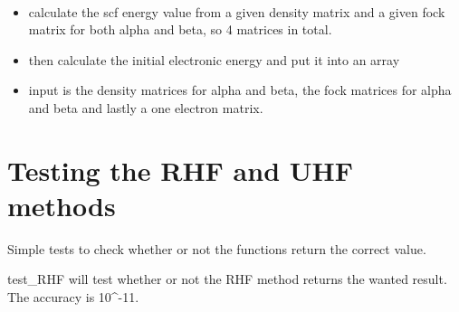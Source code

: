 \documentclass[letterpaper,10pt,english]{sphinxmanual}
\begin{document}
\begin{fulllineitems}
\label{\detokenize{SCF_functions:ghf.SCF_functions.uhf_scf_energy}}~\begin{itemize}
\item {} 
calculate the scf energy value from a given density matrix and a given fock matrix for both alpha and beta,
so 4 matrices in total.

\item {} 
then calculate the initial electronic energy and put it into an array

\item {} 
input is the density matrices for alpha and beta, the fock matrices for alpha and beta and lastly a one electron
matrix.

\end{itemize}

\end{fulllineitems}

\label{\detokenize{tests:module-ghf.tests.test_auth}}

\chapter{Testing the RHF and UHF methods}
\label{\detokenize{tests:testing-the-rhf-and-uhf-methods}}\label{\detokenize{tests::doc}}
Simple tests to check whether or not the functions return the correct value.

\begin{fulllineitems}
\label{\detokenize{tests:ghf.tests.test_auth.test_RHF}}
test\_RHF will test whether or not the RHF method returns the wanted result. The accuracy is 10\textasciicircum{}-11.

\end{fulllineitems}

\end{document}
